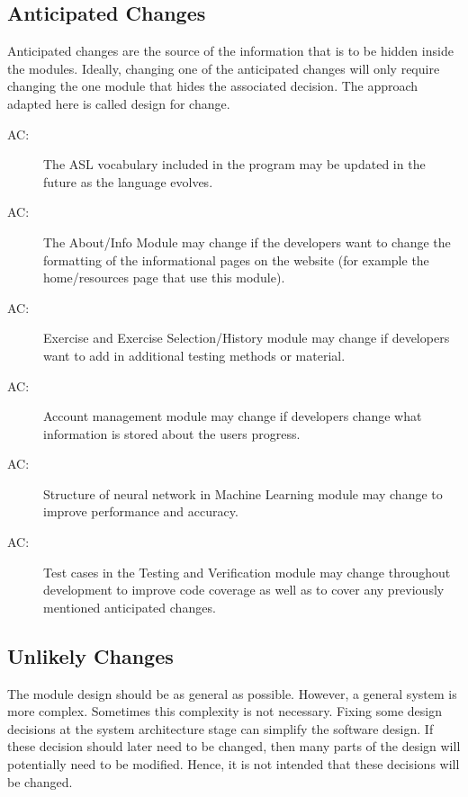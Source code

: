 \documentclass[12pt, titlepage]{article}
\newcounter{acnum}
\newcommand{\actheacnum}{AC\theacnum}
\begin{document}
\subsection{Anticipated Changes} \label{SecAchange}

Anticipated changes are the source of the information that is to be hidden
inside the modules. Ideally, changing one of the anticipated changes will only
require changing the one module that hides the associated decision. The approach
adapted here is called design for
change.

\begin{description}
\item[ \actheacnum \label{acInfo}:] The ASL vocabulary included in the program may be updated in the future as the language evolves.
\item[ \actheacnum \label{acAbout}:] The About/Info Module may change if the developers want to change the formatting of the informational pages on the website (for example the home/resources page that use this module). 
\item[ \actheacnum \label{acExercise}:] Exercise and Exercise Selection/History module may change if developers want to add in additional testing methods or material.
\item[ \actheacnum \label{acAccount}:] Account management module may change if developers change what information is stored about the users progress. 
\item[ \actheacnum \label{acMLModel}:] Structure of neural network in Machine Learning module may change to improve performance and accuracy.
\item[ \actheacnum \label{acTestVerif}:] Test cases in the Testing and Verification module may change throughout development to improve code coverage as well as to cover any previously mentioned anticipated changes.
\end{description}

\subsection{Unlikely Changes} \label{SecUchange}

The module design should be as general as possible. However, a general system is
more complex. Sometimes this complexity is not necessary. Fixing some design
decisions at the system architecture stage can simplify the software design. If
these decision should later need to be changed, then many parts of the design
will potentially need to be modified. Hence, it is not intended that these
decisions will be changed.
\end{document}
